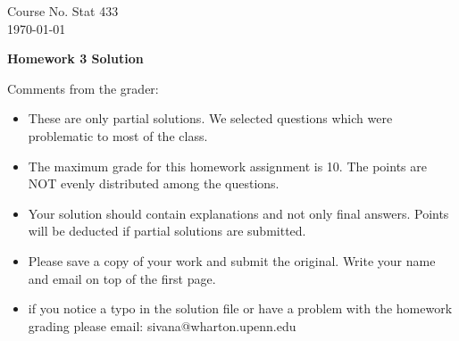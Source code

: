 \documentclass[10pt,a4paper]{article}
\begin{document}
\begin{flushleft}
Course No. Stat 433 \\
\today
\end{flushleft}

\begin{center}
{\Large{\bf  Homework 3 Solution}}
\end{center}

\textcolor[rgb]{0.98,0.00,0.00}{Comments from the grader:}
\begin{itemize}

    \item \textcolor[rgb]{0.98,0.00,0.00}{These are only partial solutions.  We selected
    questions which were problematic to most of the class.}
    \item \textcolor[rgb]{0.98,0.00,0.00}{The maximum grade for this homework assignment is 10. The points are NOT evenly distributed among the questions.}
    \item \textcolor[rgb]{0.98,0.00,0.00}{Your solution should contain explanations and not only
    final answers. Points will be deducted if partial solutions
    are submitted.}
    \item \textcolor[rgb]{0.98,0.00,0.00}{Please save a copy of your work and submit the original.
    Write your name and email on top of the first page.}
    \item \textcolor[rgb]{0.98,0.00,0.00}{if you notice a typo in the solution file or have a problem with the homework
    grading please email: sivana@wharton.upenn.edu
}
\end{itemize}
\end{document}
